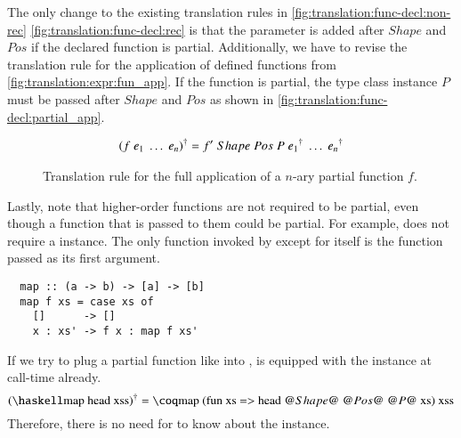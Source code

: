The only change to the existing translation rules in \autoref{fig:translation:func-decl:non-rec} \autoref{fig:translation:func-decl:rec} is that the parameter  is added after $Shape$ and $Pos$ if the declared function is partial.
Additionally, we have to revise the translation rule for the application of defined functions from \autoref{fig:translation:expr:fun_app}.
If the function is partial, the type class instance $P$ must be passed after $Shape$ and $Pos$ as shown in \autoref{fig:translation:func-decl:partial_app}.
\begin{figure}[H]
  \begin{align*}
    {(f\;e_1\;\ldots\;e_n)}^{\dagger} = f'\;Shape\;Pos\;P\;{e_1}^{\dagger}\;\ldots\;{e_n}^{\dagger}
  \end{align*}
  \caption{Translation rule for the full application of a $n$-ary partial function $f$.}
  \label{fig:translation:func-decl:partial_app}
\end{figure}

Lastly, note that higher-order functions are not required to be partial, even though a function that is passed to them could be partial.
For example,  does not require a  instance.
The only function invoked by  except for itself is the function passed as its first argument.
\begin{verbatim}
  map :: (a -> b) -> [a] -> [b]
  map f xs = case xs of
    []      -> []
    x : xs' -> f x : map f xs'
\end{verbatim}
If we try to plug a partial function like  into ,  is equipped with the  instance at call-time already.
\[
  \toCoq{(\haskellM{map head xss})}
  =
  \coqM{map (fun xs => head @$Shape$@ @$Pos$@ @$P$@ xs) xss}
\]
Therefore, there is no need for  to know about the  instance.
